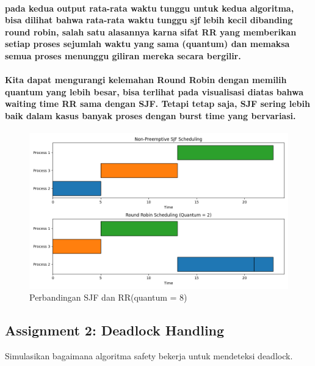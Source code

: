 \documentclass[12pt]{article}
\begin{document}
\paragraph{
\hspace*{1cm} pada kedua output rata-rata waktu tunggu untuk kedua algoritma, bisa dilihat bahwa rata-rata waktu tunggu sjf lebih kecil dibanding round robin, salah satu alasannya karna sifat RR yang memberikan setiap proses sejumlah waktu yang sama (quantum) dan memaksa semua proses menunggu giliran mereka secara bergilir.
}

\paragraph{
\hspace*{1cm} Kita dapat mengurangi kelemahan Round Robin dengan memilih quantum yang lebih besar, bisa terlihat pada visualisasi diatas bahwa waiting time RR sama dengan SJF. Tetapi tetap saja, SJF sering lebih baik dalam kasus banyak proses dengan burst time yang bervariasi.
}

\begin{figure}[H]
    \centering
    \includegraphics[width=1\linewidth]{asset/412.png}
    \caption{Perbandingan SJF dan RR(quantum = 8)}
\end{figure}


\subsection{Assignment 2: Deadlock Handling}
\hspace*{1cm} Simulasikan bagaimana algoritma safety bekerja untuk mendeteksi deadlock.
\newline
\newline
\end{document}
